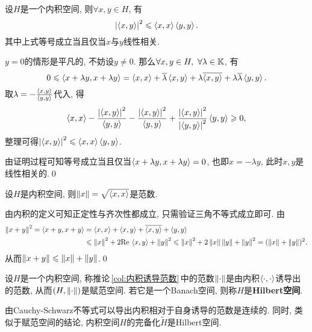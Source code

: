 	\begin{Theorem}
	设$ H $是一个内积空间, 则$ \forall x,y\in H $, 有
	\[
	\left| \left\langle x,y \right\rangle \right| ^2\leqslant\left\langle x,x \right\rangle\left\langle y,y \right\rangle.
	\]
	其中上式等号成立当且仅当$ x $与$ y $线性相关.
	\end{Theorem}
	\begin{Proof}
	$ y=0 $的情形是平凡的, 不妨设$ y\ne 0 $. 那么$ \forall x,y\in H,\ \forall\lambda\in\K $, 有
	\[
	0\leqslant\left\langle x+\lambda y,x+\lambda y \right\rangle=\left\langle x,x \right\rangle+\overline{\lambda}\left\langle x,y \right\rangle+\lambda\overline{\left\langle x,y \right\rangle}+\lambda\overline{\lambda}\left\langle y,y \right\rangle.
	\]
	取$ \lambda=-\frac{\left\langle x,y \right\rangle}{\left\langle y,y \right\rangle} $代入, 得
	\[
	\left\langle x,x \right\rangle-\frac{\left| \left\langle x,y \right\rangle \right| ^2}{\left\langle y,y \right\rangle}-\frac{\left| \left\langle x,y \right\rangle \right| ^2}{\left\langle y,y \right\rangle}+\frac{\left| \left\langle x,y \right\rangle \right| ^2}{\left| \left\langle y,y \right\rangle \right| ^2}\left\langle y,y \right\rangle\geqslant 0,
	\]
	整理可得$ \left| \left\langle x,y \right\rangle \right| ^2\leqslant\left\langle x,x \right\rangle\left\langle y,y \right\rangle $.
	
	由证明过程可知等号成立当且仅当$ \left\langle x+\lambda y,x+\lambda y \right\rangle=0 $, 也即$ x=-\lambda y $, 此时$ x,y $是线性相关的.\qed
	\end{Proof}
	
	\begin{Corollary}\label{col:内积诱导范数}
	设$ H $是内积空间, 则$ \left\| x \right\|=\sqrt{\left\langle x,x \right\rangle} $是范数.
	\end{Corollary}
	\begin{Proof}
	由内积的定义可知正定性与齐次性都成立, 只需验证三角不等式成立即可. 由
	\[
		\begin{aligned}
		\left\| x+y \right\|^2=\left\langle x+y,x+y \right\rangle&=\left\langle x,x \right\rangle+\left\langle x,y \right\rangle+\overline{\left\langle x,y \right\rangle}+\left\langle y,y \right\rangle\\
		&\leqslant\left\| x \right\|^2+2\mathrm{Re\,}\left\langle x,y \right\rangle+\left\| y \right\|^2\leqslant\left\| x \right\|^2+2\left\| x \right\|\left\| y \right\|+\left\| y \right\|^2=(\left\| x \right\|+\left\| y \right\|)^2.
		\end{aligned}
	\]
	从而$ \left\| x+y \right\|\leqslant\left\| x \right\|+\left\| y \right\| $.\qed
	\end{Proof}
	
	\begin{Definition}[Hilbert空间]\label{def:Hilbert空间}
	设$ H $是一个内积空间, 称推论\,\ref{col:内积诱导范数}\,中的范数$ \left\| \cdot \right\| $是由内积$ \left\langle \cdot,\cdot \right\rangle $诱导出的范数, 从而$ (H,\left\| \cdot \right\|) $是赋范空间. 若它是一个Banach空间, 则称$ H $是\textbf{Hilbert空间}.
	\end{Definition}
	
	由Cauchy-Schwarz不等式可以导出内积相对于自身诱导的范数是连续的. 同时, 类似于赋范空间的结论, 内积空间$ H $的完备化$ \tilde{H} $是Hilbert空间.
	
